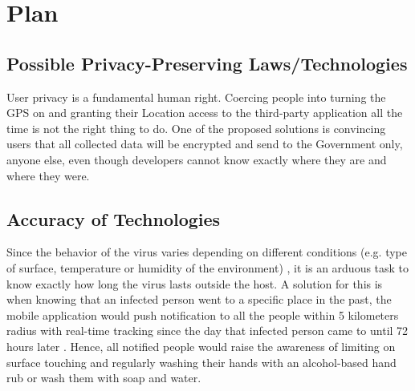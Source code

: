 \section{Plan}
  \subsection{Possible Privacy-Preserving Laws/Technologies}
    \par User privacy is a fundamental human right. Coercing people into turning the GPS on and granting their Location access to the third-party application all the time is not the right thing to do. One of the proposed solutions is convincing users that all collected data will be encrypted and send to the Government only, anyone else, even though developers cannot know exactly where they are and where they were.
  \subsection{Accuracy of Technologies}
    \par Since the behavior of the virus varies depending on different conditions (e.g. type of surface, temperature or humidity of the environment) \parencite{Plan3}, it is an arduous task to know exactly how long the virus lasts outside the host. A solution for this is when knowing that an infected person went to a specific place in the past, the mobile application would push notification to all the people within 5 kilometers radius with real-time tracking since the day that infected person came to until 72 hours later \parencite{Plan4}. Hence, all notified people would raise the awareness of limiting on surface touching and regularly washing their hands with an alcohol-based hand rub or wash them with soap and water.
